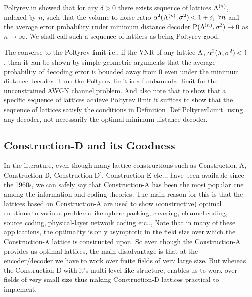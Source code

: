 \documentclass[journal,twocolumn]{IEEEtran}
\begin{document}
\begin{definition}\label{Def:PoltyrevLimit}
Poltyrev in \cite{poltyrev94} showed that for any $\delta>0$ there exists sequence of lattices $\Lambda^{(n)}$, indexed by $n$, such that the volume-to-noise ratio $\alpha^{2}(\Lambda^{(n)},\sigma^{2})<1+\delta,~ \forall n$ and the average error probability under minimum distance decoder $\text{P}(\Lambda^{(n)},\sigma^{2}) \rightarrow 0$ as $n \rightarrow \infty$. We shall call such a sequence of lattices as being Poltyrev-good.
\end{definition}
\begin{Remark}
The converse to the Poltyrev limit i.e., if the VNR of any lattice $\Lambda$, $\alpha^{2}(\Lambda,\sigma^{2})<1$, then it can be shown by simple geometric arguments that the average probability of decoding error is bounded away from $0$ even under the minimum distance decoder. Thus the Poltyrev limit is a fundamental limit for the unconstrained AWGN channel problem. And also note that to show that a specific sequence of lattices achieve Poltyrev limit it suffices to show that the sequence of lattices satisfy the conditions in Definition \ref{Def:PoltyrevLimit} using any decoder, not necessarily the optimal minimum distance decoder.
\end{Remark}
\subsection{Construction-D and its Goodness}
In the literature, even though many lattice constructions such as Construction-A, Construction-D, Construction-D$^\prime$, Construction E etc.., have been available  since the 1960s, we can safely say that Construction-A has been the most popular one among the information and coding theories. The main reason for this is that the lattices based on Construction-A are used to show (constructive) optimal solutions to various problems like sphere packing, covering, channel coding, source coding, physical-layer network coding etc.., Note that in many of these applications, the optimality is only asymptotic in the field size over which the Construction-A lattice is constructed upon. So even though the Construction-A provides us optimal lattices, the main disadvantage is that at the encoder/decoder we have to work over finite fields of very large size. But whereas the Construction-D with it's multi-level like structure, enables us to work over fields of very small size thus making Construction-D lattices practical to implement.
\end{document}
